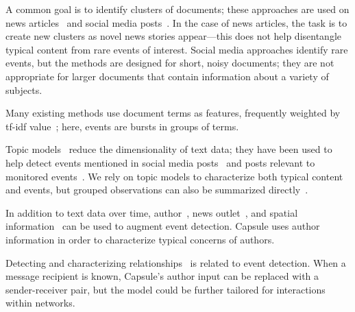 
A common goal is to identify clusters of documents; these approaches are used on news articles~\cite{zhao2012novel,zhao2007temporal,zhang2002novelty,li2005probabilistic,wang2007mining,allan1998line} and social media posts~\cite{VanDam:2012,lau2012line,jackoway2011identification,sakaki2010earthquake,reuter2012event,becker2010learning,sayyadi2009event}.  
In the case of news articles, the task is to create new clusters as novel news stories appear---this does not help disentangle typical content from rare events of interest.
Social media approaches identify rare events, but the methods are designed for short, noisy documents; they are not appropriate for larger documents that contain information about a variety of subjects.

Many existing methods use document terms as features, frequently weighted by tf-idf value~\cite{fung2005parameter,kumaran2004text,brants2003system,das2011dynamic,zhao2007temporal,zhao2012novel}; here, events are bursts in groups of terms. %

Topic models~\cite{Blei:2012} reduce the dimensionality of text data; they have been used to help detect events mentioned in social media posts~\cite{lau2012line,dou2012leadline} and posts relevant to monitored events~\cite{VanDam:2012}.
We rely on topic models to characterize both typical content and events, but grouped observations can also be summarized directly~\cite{peng2007event,chakrabarti2011event,gao2012joint}.

In addition to text data over time, author~\cite{zhao2007temporal}, news outlet~\cite{wang2007mining}, and spatial information~\cite{Neill:2005,mathioudakis2010identifying,liu2011using} can be used to augment event detection.  Capsule uses author information in order to characterize typical concerns of authors.

Detecting and characterizing relationships~\cite{schein2015bayesian,linderman2014discovering,das2011dynamic} is related to event detection.  When a message recipient is known, Capsule's author input can be replaced with a sender-receiver pair, but the model could be further tailored for interactions within networks.

